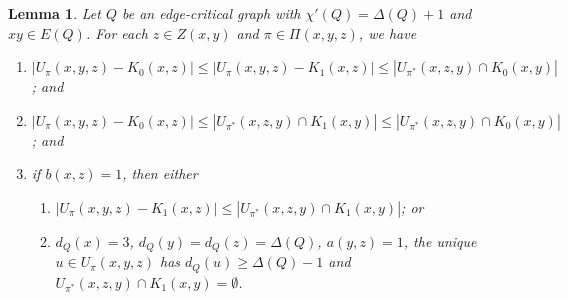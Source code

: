 \documentclass[12pt,reqno]{amsart}
\theoremstyle{plain}
\newtheorem{lem}[thm]{Lemma}
\theoremstyle{definition}
\theoremstyle{remark}
\newcommand{\card}[1]{\left|#1\right|}
\begin{document}
\begin{lem}\label{WoodallImprovementU}
Let $Q$ be an edge-critical graph with $\chi'(Q) = \Delta(Q) + 1$ and $xy \in E(Q)$.  For each $z \in Z(x, y)$ and $\pi \in \Pi(x,y,z)$, we have 
\begin{enumerate}
\item $\card{U_\pi(x,y,z) - K_0(x, z)} \le \card{U_\pi(x,y,z) - K_1(x, z)} \le \card{U_{\pi^*}(x, z, y) \cap K_0(x, y)}$; and
\item $\card{U_\pi(x,y,z) - K_0(x, z)} \le \card{U_{\pi^*}(x, z, y) \cap K_1(x, y)} \le \card{U_{\pi^*}(x, z, y) \cap K_0(x, y)}$; and
\item if $b(x, z) = 1$, then either
	\begin{enumerate}
	\item $\card{U_\pi(x,y,z) - K_1(x, z)} \le \card{U_{\pi^*}(x, z, y) \cap K_1(x, y)}$; or
	\item $d_Q(x) = 3$, $d_Q(y) = d_Q(z) = \Delta(Q)$, $a(y, z) = 1$, the unique $u \in U_\pi(x,y,z)$ has $d_Q(u) \ge \Delta(Q) - 1$ and $U_{\pi^*}(x, z, y) \cap K_1(x, y) = \emptyset$.
	\end{enumerate}
\end{enumerate}
\end{lem}
\end{document}
